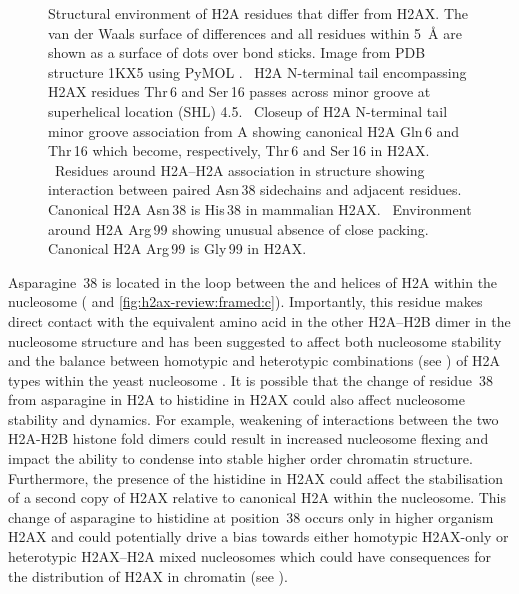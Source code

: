 \begin{figure}
\caption[Structural environment of H2A residues that differ from H2AX]%
        {Structural environment of H2A residues that differ from
          H2AX\@. The van der Waals surface of differences and all
          residues within \SI{5}{\angstrom} are shown as a surface of
          dots over bond sticks. Image from PDB structure 1KX5 using
          PyMOL \citep{DeL02}.
          ~H2A N-terminal
          tail encompassing H2AX residues Thr\,6 and Ser\,16 passes
          across minor groove at superhelical location (SHL) 4.5\@.
          ~Closeup of H2A
          N-terminal tail minor groove association from A showing
          canonical H2A Gln\,6 and Thr\,16 which become, respectively,
          Thr\,6 and Ser\,16 in H2AX\@.
          ~Residues around
          H2A--H2A association in structure showing interaction
          between paired Asn\,38 sidechains and adjacent
          residues. Canonical H2A Asn\,38 is His\,38 in mammalian
          H2AX\@.
          ~Environment around
          H2A Arg\,99 showing unusual absence of close packing.
          Canonical H2A Arg\,99 is Gly\,99 in H2AX.}
\label{fig:h2ax-review:framed}
\end{figure}

Asparagine~38 is located in the loop between the  and
 helices of H2A within the nucleosome
( and
\ref{fig:h2ax-review:framed:c}). Importantly, this residue makes
direct contact with the equivalent amino acid in the other H2A--H2B
dimer in the nucleosome structure and has been suggested to affect
both nucleosome stability and the balance between homotypic and
heterotypic combinations (see
) of H2A types within the
yeast nucleosome \citep{CLW01}. It is possible that the change of
residue~38 from asparagine in H2A to histidine in H2AX could also
affect nucleosome stability and dynamics. For example, weakening of
interactions between the two H2A-H2B histone fold dimers could result
in increased nucleosome flexing and impact the ability to condense
into stable higher order chromatin structure. Furthermore, the
presence of the histidine in H2AX could affect the stabilisation of a
second copy of H2AX relative to canonical H2A within the
nucleosome. This change of asparagine to histidine at position~38
occurs only in higher organism H2AX and could potentially drive a bias
towards either homotypic H2AX-only or heterotypic H2AX--H2A mixed
nucleosomes which could have consequences for the distribution of H2AX
in chromatin (see ).

